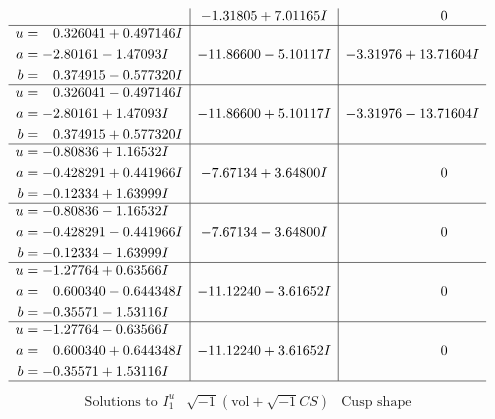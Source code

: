 \documentclass[1p]{elsarticle_modified}
\theoremstyle{definition}
\newcommand{\I}{\sqrt{-1}}
\begin{document}
$$\begin{array}{c|c|c}
 & -1.31805 + 7.01165 I & \phantom{-0.000000 } 0 \\ \hline\begin{aligned}
u &= \phantom{-}0.326041 + 0.497146 I \\
a &= -2.80161 - 1.47093 I \\
b &= \phantom{-}0.374915 - 0.577320 I\end{aligned}
 & -11.86600 - 5.10117 I & -3.31976 + 13.71604 I \\ \hline\begin{aligned}
u &= \phantom{-}0.326041 - 0.497146 I \\
a &= -2.80161 + 1.47093 I \\
b &= \phantom{-}0.374915 + 0.577320 I\end{aligned}
 & -11.86600 + 5.10117 I & -3.31976 - 13.71604 I \\ \hline\begin{aligned}
u &= -0.80836 + 1.16532 I \\
a &= -0.428291 + 0.441966 I \\
b &= -0.12334 + 1.63999 I\end{aligned}
 & -7.67134 + 3.64800 I & \phantom{-0.000000 } 0 \\ \hline\begin{aligned}
u &= -0.80836 - 1.16532 I \\
a &= -0.428291 - 0.441966 I \\
b &= -0.12334 - 1.63999 I\end{aligned}
 & -7.67134 - 3.64800 I & \phantom{-0.000000 } 0 \\ \hline\begin{aligned}
u &= -1.27764 + 0.63566 I \\
a &= \phantom{-}0.600340 - 0.644348 I \\
b &= -0.35571 - 1.53116 I\end{aligned}
 & -11.12240 - 3.61652 I & \phantom{-0.000000 } 0 \\ \hline\begin{aligned}
u &= -1.27764 - 0.63566 I \\
a &= \phantom{-}0.600340 + 0.644348 I \\
b &= -0.35571 + 1.53116 I\end{aligned}
 & -11.12240 + 3.61652 I & \phantom{-0.000000 } 0\\
 \hline 
 \end{array}$$\newpage$$\begin{array}{c|c|c}  
\text{Solutions to }I^u_{1}& \I (\text{vol} + \sqrt{-1}CS) & \text{Cusp shape}\\

\end{array}$$
\end{document}
